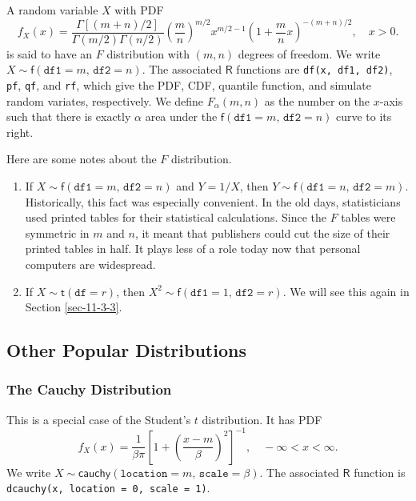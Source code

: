 \documentclass[captions=tableheading]{scrbook}
\begin{document}
A random variable \(X\) with PDF
\begin{equation}
f_{X}(x)=\frac{\Gamma[(m+n)/2]}{\Gamma(m/2)\Gamma(n/2)}\left(\frac{m}{n}\right)^{m/2}x^{m/2-1}\left(1+\frac{m}{n}x\right)^{-(m+n)/2},\quad x>0.
\end{equation}
is said to have an \(F\) distribution with \((m,n)\) degrees of freedom. We write \(X\sim\mathsf{f}(\mathtt{df1}=m,\,\mathtt{df2}=n)\). The associated \(\mathsf{R}\) functions are \texttt{df(x, df1, df2)}, \texttt{pf}, \texttt{qf}, and \texttt{rf}, which give the PDF, CDF, quantile function, and simulate random variates, respectively. We define \(F_{\alpha}(m,n)\) as the number on the \(x\)-axis such that there is exactly \(\alpha\) area under the \(\mathsf{f}(\mathtt{df1}=m,\,\mathtt{df2}=n)\) curve to its right. 

\begin{rem}
Here are some notes about the \(F\) distribution.
\begin{enumerate}
\item If \(X\sim\mathsf{f}(\mathtt{df1}=m,\,\mathtt{df2}=n)\) and \(Y=1/X\), then \(Y\sim\mathsf{f}(\mathtt{df1}=n,\,\mathtt{df2}=m)\). Historically, this fact was especially convenient. In the old days, statisticians used printed tables for their statistical calculations. Since the \(F\) tables were symmetric in \(m\) and \(n\), it meant that publishers could cut the size of their printed tables in half. It plays less of a role today now that personal computers are widespread.
\item If \(X\sim\mathsf{t}(\mathtt{df}=r)\), then \(X^{2}\sim\mathsf{f}(\mathtt{df1}=1,\,\mathtt{df2}=r)\). We will see this again in Section \ref{sec-11-3-3}.
\end{enumerate}

\end{rem}
\subsection{Other Popular Distributions}
\label{sec-6-5-3}
\label{sub-Other-Popular-Distributions}
\subsubsection{The Cauchy Distribution}
\label{sec-6-5-3-1}
\label{sub-The-Cauchy-Distribution}


This is a special case of the Student's \(t\) distribution. It has PDF
\begin{equation}
f_{X}(x) = \frac{1}{\beta\pi} \left[ 1+\left( \frac{x-m}{\beta} \right)^{2} \right]^{-1},\quad -\infty < x < \infty.
\end{equation}
We write \(X\sim\mathsf{cauchy}(\mathtt{location}=m,\,\mathtt{scale}=\beta)\). The associated \(\mathsf{R}\) function is \texttt{dcauchy(x, location = 0, scale = 1)}.
\end{document}

